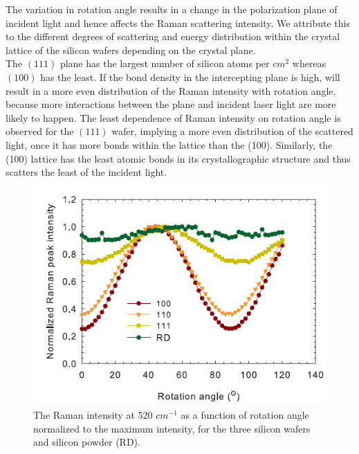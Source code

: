\documentclass[openany,11pt,a4paper]{report}
\begin{document}

The variation in
rotation angle results in a change in the polarization plane of incident light and hence affects the Raman scattering intensity. We attribute this to the different degrees of scattering and energy
distribution within the crystal lattice of the silicon wafers depending on the crystal plane.\\



The $(111)$ plane has the largest number of silicon atoms per $cm^{2}$ whereas $(100)$ has the least. If the bond density in the
intercepting plane is high, will result in a more even distribution of the Raman intensity with
rotation angle, because more interactions between the plane and incident laser light are more likely to happen. The least dependence of Raman intensity on rotation angle is observed for the $(111)$ wafer, implying a more
even distribution of the scattered light, once it has more bonds within the lattice than the (100). Similarly, the (100) lattice has the least atomic bonds in its crystallographic
structure and thus scatters the least of the incident light. \cite{sos}





\begin{figure}[H]
\centering
\includegraphics[scale=0.9]{Collective.PNG}
\caption{The Raman intensity at 520 $cm^{-1}$ as a function of rotation angle normalized to the
maximum intensity, for the three silicon wafers and silicon powder (RD). \cite{sos}}
\end{figure}
\end{document}
